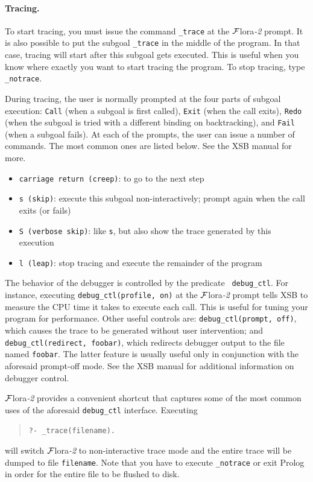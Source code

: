 \documentclass[11pt]{article}
\newcommand{\FLORA}{{\mbox{\sc ${\cal F}${lora}\rm\emph{-2}}}\xspace}
\begin{document}
\paragraph{Tracing.}
To start tracing, you must issue the command {\tt \_trace} at the
\FLORA prompt. It is also possible to put the subgoal {\tt \_trace} in
the middle of the program. In that case, tracing will start after this
subgoal gets executed. This is useful when you know where exactly you want
to start tracing the program. To stop tracing, type {\tt \_notrace}.

During tracing, the user is normally prompted at the four parts of subgoal
execution: {\tt Call} (when a subgoal is first called), {\tt Exit} (when
the call exits), {\tt Redo} (when the subgoal is tried with a different
binding on backtracking), and {\tt Fail} (when a subgoal fails).
At each of the prompts, the user can issue a number of commands. The most
common ones are listed below. See the XSB manual for more.
\begin{itemize}
  \item {\tt carriage return (creep)}:  to go to the next step  
  \item {\tt s (skip)}: execute this subgoal non-interactively; prompt
    again when the call exits (or fails)
  \item {\tt S (verbose skip)}: like {\tt s}, but also show the trace
    generated by this execution
  \item {\tt l (leap)}: stop tracing and execute the remainder of the
    program
\end{itemize}
The behavior of the debugger is controlled by the predicate {\tt
  debug\_ctl}. For instance, executing {\tt debug\_ctl(profile, on)} at the
\FLORA prompt tells XSB to measure the CPU time it takes to execute each
call. This is useful for tuning your program for performance. Other useful
controls are: {\tt debug\_ctl(prompt, off)}, which causes the trace to be
generated without user intervention; and {\tt debug\_ctl(redirect,
  foobar)}, which redirects debugger output to the file named {\tt foobar}.
The latter feature is usually useful only in conjunction with the aforesaid
prompt-off mode. See the XSB manual for additional information on debugger
control.

\FLORA provides a convenient shortcut that captures some of the most common
uses of the aforesaid {\tt debug\_ctl} interface. Executing
\begin{quote}
  {\tt     ?- \_trace(filename).}
\end{quote}
will switch \FLORA to non-interactive trace mode
and the entire trace will be dumped to file {\tt filename}.
Note that you have to execute {\tt \_notrace} or exit Prolog in order for the
entire file to be flushed to disk.
\end{document}
